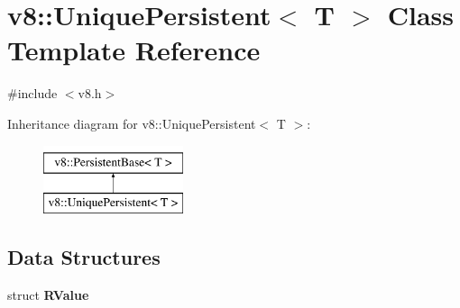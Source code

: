 \hypertarget{classv8_1_1UniquePersistent}{\section{v8\-:\-:Unique\-Persistent$<$ T $>$ Class Template Reference}
\label{classv8_1_1UniquePersistent}
}


{\ttfamily \#include $<$v8.\-h$>$}

Inheritance diagram for v8\-:\-:Unique\-Persistent$<$ T $>$\-:\begin{figure}[H]
\begin{center}
\leavevmode
\includegraphics[height=2.000000cm]{classv8_1_1UniquePersistent}
\end{center}
\end{figure}
\subsection*{Data Structures}
\begin{DoxyCompactItemize}
\item 
struct {\bfseries R\-Value}
\end{DoxyCompactItemize}
